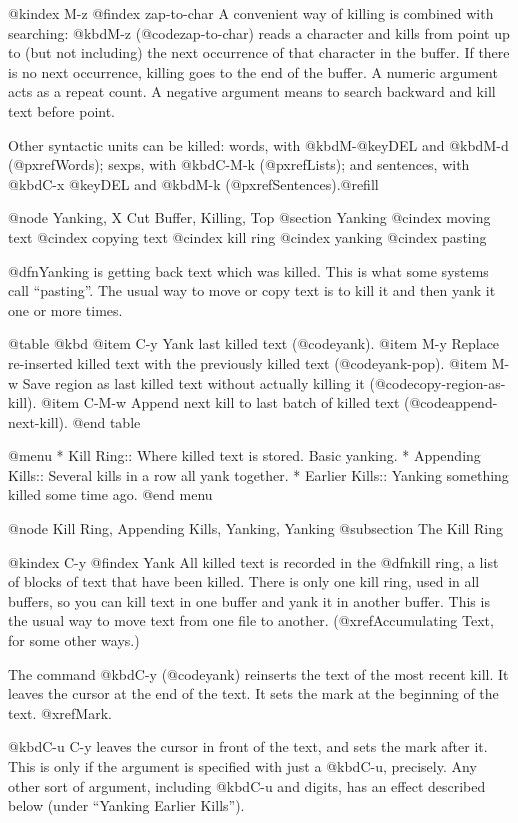 {{{{{{{{@kindex M-z
@findex zap-to-char
  A convenient way of killing is combined with searching: @kbd{M-z}
(@code{zap-to-char}) reads a character and kills from point up to (but not
including) the next occurrence of that character in the buffer.  If there
is no next occurrence, killing goes to the end of the buffer.  A numeric
argument acts as a repeat count.  A negative argument means to search
backward and kill text before point.

  Other syntactic units can be killed: words, with @kbd{M-@key{DEL}} and
@kbd{M-d} (@pxref{Words}); sexps, with @kbd{C-M-k} (@pxref{Lists}); and
sentences, with @kbd{C-x @key{DEL}} and @kbd{M-k}
(@pxref{Sentences}).@refill

@node Yanking, X Cut Buffer, Killing, Top
@section Yanking
@cindex moving text
@cindex copying text
@cindex kill ring
@cindex yanking
@cindex pasting

  @dfn{Yanking} is getting back text which was killed.  This is what some
systems call ``pasting''.  The usual way to move or copy text is to kill it
and then yank it one or more times.

@table @kbd
@item C-y
Yank last killed text (@code{yank}).
@item M-y
Replace re-inserted killed text with the previously killed text
(@code{yank-pop}).
@item M-w
Save region as last killed text without actually killing it
(@code{copy-region-as-kill}).
@item C-M-w
Append next kill to last batch of killed text (@code{append-next-kill}).
@end table

@menu
* Kill Ring::       Where killed text is stored.  Basic yanking.
* Appending Kills:: Several kills in a row all yank together.
* Earlier Kills::   Yanking something killed some time ago.
@end menu

@node Kill Ring, Appending Kills, Yanking, Yanking
@subsection The Kill Ring

@kindex C-y
@findex Yank
  All killed text is recorded in the @dfn{kill ring}, a list of blocks of
text that have been killed.  There is only one kill ring, used in all
buffers, so you can kill text in one buffer and yank it in another buffer.
This is the usual way to move text from one file to another.
(@xref{Accumulating Text}, for some other ways.)

  The command @kbd{C-y} (@code{yank}) reinserts the text of the most recent
kill.  It leaves the cursor at the end of the text.  It sets the mark at
the beginning of the text.  @xref{Mark}.

  @kbd{C-u C-y} leaves the cursor in front of the text, and sets the mark
after it.  This is only if the argument is specified with just a @kbd{C-u},
precisely.  Any other sort of argument, including @kbd{C-u} and digits, has
an effect described below (under ``Yanking Earlier Kills'').

}}}}}}}}
